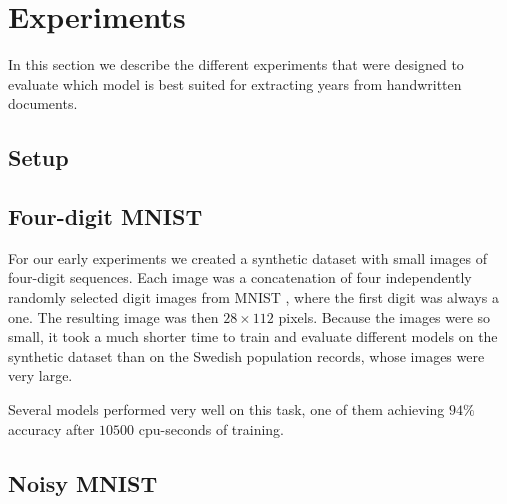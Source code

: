 
\section{Experiments}

In this section we describe the different experiments that were designed to evaluate which model is best suited for extracting years from handwritten documents.

\subsection{Setup}




\subsection{Four-digit MNIST} \label{ssec:pretrain}

For our early experiments we created a synthetic dataset with small images of four-digit sequences.
Each image was a concatenation of four independently randomly selected digit images from MNIST \cite{MNIST_orig}, where the first digit was always a one. The resulting image was then $28 \times 112$ pixels.
Because the images were so small, it took a much shorter time to train and evaluate different models on the synthetic dataset than on the Swedish population records, whose images were very large.

Several models performed very well on this task, one of them achieving $94\%$ accuracy after $10500$ cpu-seconds of training.

\subsection{Noisy MNIST}


